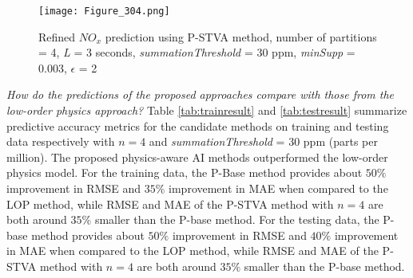 \documentclass[letterpaper]{article} %
\begin{document}
\begin{figure}
    \centering
    \texttt{[image:  Figure\_304.png]}
    \caption{Refined $NO_{x}$ prediction using P-STVA method, number of partitions = 4, \textit{L} = 3 seconds, \textit{summationThreshold} = 30 ppm, \textit{minSupp} = 0.003, $\epsilon$ = 2}
    \label{fig:refined}
    \vspace{-10pt}
\end{figure}


\textit{How do the predictions of the proposed approaches compare with those from the low-order physics approach?} Table \ref{tab:trainresult} and \ref{tab:testresult} summarize predictive accuracy metrics for the candidate methods on training and testing data respectively with $n=4$ and \textit{summationThreshold} = 30 ppm (parts per million). The proposed physics-aware AI methods outperformed the low-order physics model. For the training data, the P-Base method provides about $50\%$ improvement in RMSE and $35\%$ improvement in MAE when compared to the LOP method, while RMSE and MAE of the P-STVA method with $n=4$ are both around $35\%$ smaller than the P-base method. For the testing data, the P-base method provides about $50\%$ improvement in RMSE and $40\%$ improvement in MAE when compared to the LOP method, while RMSE and MAE of the P-STVA method with $n=4$ are both around $35\%$ smaller than the P-base method. 
\end{document}
